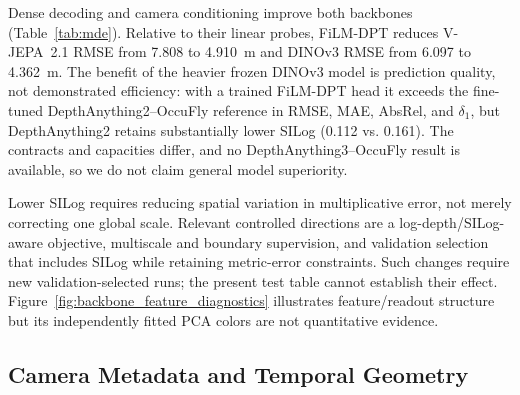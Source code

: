 Dense decoding and camera conditioning improve both backbones (Table~\ref{tab:mde}). Relative to their linear probes, FiLM-DPT reduces V-JEPA~2.1 RMSE from 7.808 to 4.910~m and DINOv3 RMSE from 6.097 to 4.362~m. The benefit of the heavier frozen DINOv3 model is prediction quality, not demonstrated efficiency: with a trained FiLM-DPT head it exceeds the fine-tuned DepthAnything2--OccuFly reference in RMSE, MAE, AbsRel, and $\delta_1$, but DepthAnything2 retains substantially lower SILog (0.112 vs. 0.161). The contracts and capacities differ, and no DepthAnything3--OccuFly result is available, so we do not claim general model superiority.

Lower SILog requires reducing spatial variation in multiplicative error, not merely correcting one global scale. Relevant controlled directions are a log-depth/SILog-aware objective, multiscale and boundary supervision, and validation selection that includes SILog while retaining metric-error constraints. Such changes require new validation-selected runs; the present test table cannot establish their effect. Figure~\ref{fig:backbone_feature_diagnostics} illustrates feature/readout structure but its independently fitted PCA colors are not quantitative evidence.

\subsection{Camera Metadata and Temporal Geometry}
\begin{table}[t]
  \caption{\textbf{FiLM conditioning ablation using the V-JEPA~2.1 backbone.} Test mean$\pm$SD over three
  seeds; best mean in \textbf{bold}.}
  \label{tab:film-aggregate}
  \centering
  \footnotesize
  \setlength{\tabcolsep}{2.6pt}
\end{table}

